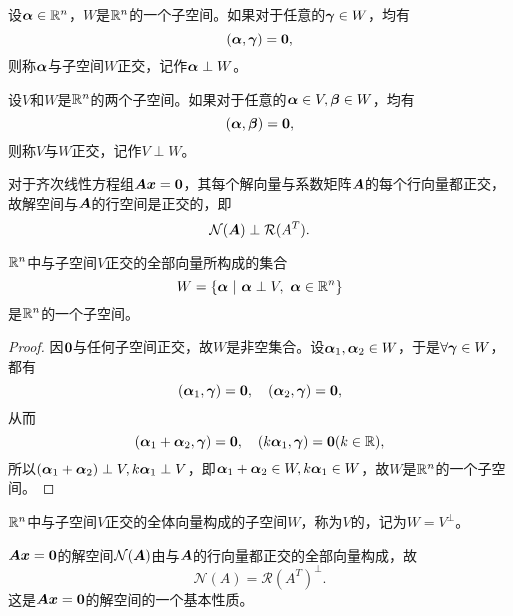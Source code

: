 \begin{frame}
\begin{dingyi}
设$\boldsymbol{\alpha} \in \mathbb R^n$，$W$是$\mathbb R^n$的一个子空间。如果对于任意的$\boldsymbol{\gamma} \in W$，均有
$$
(\alphabd, \gammabd) = \M0,
$$
则称$\boldsymbol{\alpha}$与子空间$W$正交，记作$\boldsymbol{\alpha} \perp W$。
\end{dingyi}	\vspace{.1in}\pause


\begin{dingyi}
	设$V$和$W$是$\mathbb R^n$的两个子空间。如果对于任意的$\boldsymbol{\alpha} \in V, \boldsymbol{\beta} \in W$，均有
	$$
	(\alphabd, \betabd) = \M0,
	$$
	则称$V$与$W$正交，记作$V \perp W$。
\end{dingyi}

\end{frame}

\begin{frame}

\begin{li}
对于齐次线性方程组$\MA\vx=\M0$，其每个解向量与系数矩阵$\boldsymbol{A}$的每个行向量都正交，故解空间与$\boldsymbol{A}$的行空间是正交的，即
$$
\mathcal N(\boldsymbol{A}) \perp \mathcal R(A^T).
$$
\end{li}

\end{frame}

\begin{frame}
\begin{dingli}
$\mathbb R^n$中与子空间$V$正交的全部向量所构成的集合
$$
W=\{\boldsymbol{\alpha} ~|~ \boldsymbol{\alpha} \perp V, ~ \boldsymbol{\alpha} \in \mathbb R^n \}
$$
是$\mathbb R^n$的一个子空间。
\end{dingli}\vspace{.1in}\pause

\begin{proof}
因$\M0$与任何子空间正交，故$W$是非空集合。设$\boldsymbol{\alpha}_1,\boldsymbol{\alpha}_2\in W$，于是$\forall \boldsymbol{\gamma} \in W$，都有
$$
(\alphabd_1, \gammabd) = \M0, \quad
(\alphabd_2, \gammabd) = \M0,
$$
从而
$$
(\alphabd_1+\alphabd_2, \gammabd) = \M0, \quad
(k\alphabd_1, \gammabd) = \M0 (k \in \R),
$$
所以$(\boldsymbol{\alpha}_1+\boldsymbol{\alpha}_2)\perp V, k\boldsymbol{\alpha}_1\perp V$，即$\boldsymbol{\alpha}_1+\boldsymbol{\alpha}_2\in W, k\boldsymbol{\alpha}_1\in W$，故$W$是$\mathbb R^n$的一个子空间。
\end{proof}

\end{frame}

\begin{frame}
\begin{dingyi}
$\mathbb R^n$中与子空间$V$正交的全体向量构成的子空间$W$，称为$V$的，记为$W=V^\perp$。
\end{dingyi}\vspace{.1in}\pause

\begin{li}
$\MA \vx = \M0$的解空间$\mathcal N(\boldsymbol{A})$由与$\boldsymbol{A}$的行向量都正交的全部向量构成，故
$$
\mathcal N(A) = \mathcal R(A^T)^\perp. 
$$
这是$\MA \vx = \M0$的解空间的一个基本性质。
\end{li}
\end{frame}